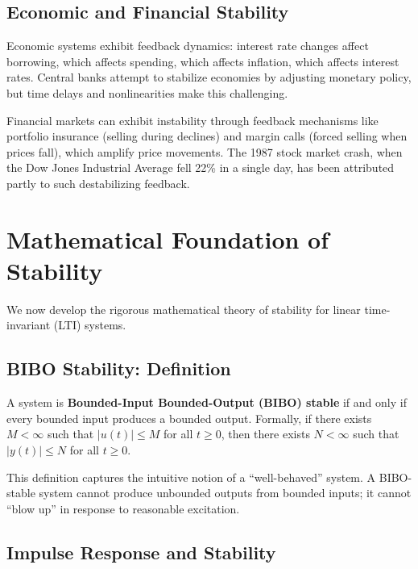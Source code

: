 \subsection{Economic and Financial Stability}

Economic systems exhibit feedback dynamics: interest rate changes affect borrowing, which affects spending, which affects inflation, which affects interest rates. Central banks attempt to stabilize economies by adjusting monetary policy, but time delays and nonlinearities make this challenging.

Financial markets can exhibit instability through feedback mechanisms like portfolio insurance (selling during declines) and margin calls (forced selling when prices fall), which amplify price movements. The 1987 stock market crash, when the Dow Jones Industrial Average fell 22\% in a single day, has been attributed partly to such destabilizing feedback.

\section{Mathematical Foundation of Stability}
\label{sec:math_foundation}

We now develop the rigorous mathematical theory of stability for linear time-invariant (LTI) systems.

\subsection{BIBO Stability: Definition}

\begin{definition}
\label{def:bibo}
A system is \textbf{Bounded-Input Bounded-Output (BIBO) stable} if and only if every bounded input produces a bounded output. Formally, if there exists $M < \infty$ such that $|u(t)| \leq M$ for all $t \geq 0$, then there exists $N < \infty$ such that $|y(t)| \leq N$ for all $t \geq 0$.
\end{definition}

This definition captures the intuitive notion of a ``well-behaved'' system. A BIBO-stable system cannot produce unbounded outputs from bounded inputs; it cannot ``blow up'' in response to reasonable excitation.

\subsection{Impulse Response and Stability}

